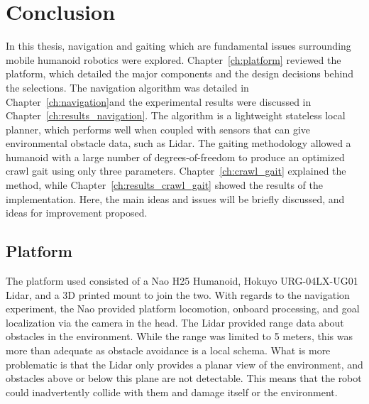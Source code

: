 \chapter{Conclusion} \label{ch:conclusion}
In this thesis, navigation and gaiting which are fundamental issues surrounding
mobile humanoid robotics were explored.
Chapter~\ref{ch:platform} reviewed the platform, which detailed the major 
components and the design decisions behind the selections.
The navigation algorithm was detailed in Chapter~\ref{ch:navigation}and the
experimental results were discussed in Chapter~\ref{ch:results_navigation}.
The algorithm is a lightweight stateless local planner, which performs well when
coupled with sensors that can give environmental obstacle data, such as Lidar.
The gaiting methodology allowed a humanoid with a large number of
degrees-of-freedom to produce an optimized crawl gait using only three
parameters. Chapter~\ref{ch:crawl_gait} explained the method, while
Chapter~\ref{ch:results_crawl_gait} showed the results of the implementation.
Here, the main ideas and issues will be briefly discussed, and ideas for
improvement proposed.

\section{Platform}
The platform used consisted of a Nao H25 Humanoid, Hokuyo URG-04LX-UG01 Lidar, 
and a 3D printed mount to join the two. With regards to the navigation 
experiment, the Nao provided platform locomotion, onboard processing, and goal 
localization via the camera in the head. The Lidar provided range data about
obstacles in the environment. While the range was limited to 5 meters, this
was more than adequate as obstacle avoidance is a local schema. What is more
problematic is that the Lidar only provides a planar view of the environment,
and obstacles above or below this plane are not detectable.
This means that the robot could inadvertently collide with them and damage
itself or the environment.

